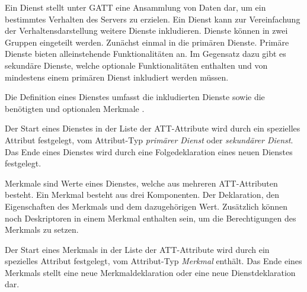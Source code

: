 Ein Dienst stellt unter \ac{GATT} eine Ansammlung von Daten dar, um ein bestimmtes Verhalten des Servers zu erzielen. Ein Dienst kann zur Vereinfachung der Verhaltensdarstellung weitere Dienste inkludieren. Dienste können in zwei Gruppen eingeteilt werden. Zunächst einmal in die primären Dienste. Primäre Dienste bieten alleinstehende Funktionalitäten an. Im Gegensatz dazu gibt es sekundäre Dienste, welche optionale Funktionalitäten enthalten und von mindestens einem primären Dienst inkludiert werden müssen. \cite[S.~281]{bluetoothCore}

Die Definition eines Dienstes umfasst die inkludierten Dienste sowie die benötigten und optionalen Merkmale \cite[S.~1481]{bluetoothCore}.

Der Start eines Dienstes in der Liste der \ac{ATT}-Attribute wird durch ein spezielles Attribut festgelegt, vom Attribut-Typ \textit{primärer Dienst} oder \textit{sekundärer Dienst}. Das Ende eines Dienstes wird durch eine Folgedeklaration eines neuen Dienstes festgelegt. \cite[S.~1483]{bluetoothCore}

Merkmale sind Werte eines Dienstes, welche aus mehreren \ac{ATT}-Attributen besteht. Ein Merkmal besteht aus drei Komponenten. Der Deklaration, den Eigenschaften des Merkmals und dem dazugehörigen Wert. Zusätzlich können noch Deskriptoren in einem Merkmal enthalten sein, um die Berechtigungen des Merkmals zu setzen. \cite[S.~281]{bluetoothCore}

Der Start eines Merkmals in der Liste der \ac{ATT}-Attribute wird durch ein spezielles Attribut festgelegt, vom Attribut-Typ \textit{Merkmal} enthält. Das Ende eines Merkmals stellt eine neue Merkmaldeklaration oder eine neue Dienstdeklaration dar. \cite[S.~1484ff.]{bluetoothCore}

